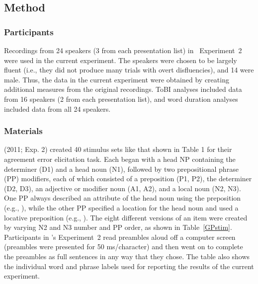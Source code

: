 \documentclass[12pt,titlepage]{article}
\newcommand{\IGNORE}[1]{} %
\begin{document}
\subsection{Method}
\subsubsection{Participants} Recordings from 24 speakers (3 from each presentation list) in ~Experiment~2 were used in the current experiment. The speakers were chosen to be largely fluent (i.e., they did not produce many trials with overt disfluencies), and 14 were male. Thus, the data in the current experiment were obtained by creating additional measures from the original recordings. ToBI analyses included data from 16 speakers (2 from each presentation list), and word duration analyses included data from all 24 speakers.

\subsubsection{Materials} \citeauthor{GillespiePearlmutter11} (2011; Exp. 2) created 40 stimulus sets like that shown in Table 1 for their agreement error elicitation task.\IGNORE{Forty stimulus sets like that shown in Table~\ref{GPstim} were created for an agreement error elicitation task reported in \citeauthor{GillespiePearlmutter11} (\citeyearNP{GillespiePearlmutter11}; Experiment~2). } Each began with a head NP containing the determiner  (D1) and a head noun (N1), followed by two prepositional phrase (PP) modifiers, each of which consisted of a preposition (P1, P2), the determiner  (D2, D3), an adjective or modifier noun (A1, A2), and a local noun  (N2, N3).  One PP always described an attribute of the head noun using the preposition
 (e.g., ), while the other PP
specified a location for the head noun and used a locative preposition
(e.g., ).   The eight different versions of an item
were created by varying N2 and N3 number and PP order, as shown
in Table~\ref{GPstim}.  Participants in \citeauthor{GillespiePearlmutter11}'s \citeyear{GillespiePearlmutter11} Experiment~2 read preambles aloud off a computer screen (preambles were presented for 50 ms/character) and then went on to complete the preambles as full sentences in any way that they chose. The table also shows the individual word and phrase labels used for reporting the results of the current experiment.
\end{document}
